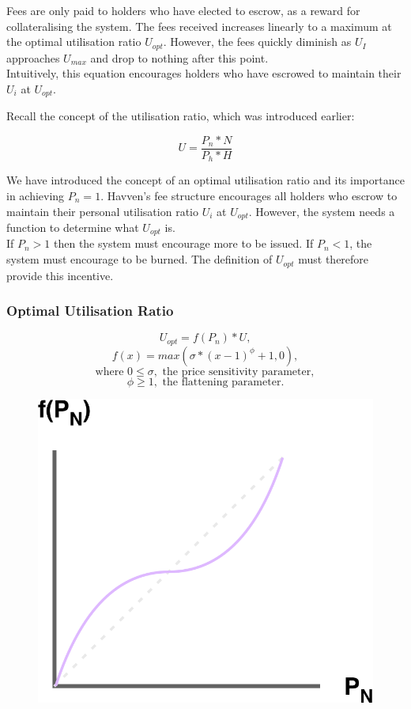 \noindent Fees are only paid to \HAV{} holders who have elected to escrow, as a reward for collateralising the system. The fees received increases linearly to a maximum at the optimal utilisation ratio $U_{opt}$. However, the fees quickly diminish as $U_I$ approaches $U_{max}$ and drop to nothing after this point. \\

\noindent Intuitively, this equation encourages \HAV{} holders who have escrowed to maintain their $U_i$ at $U_{opt}$. 

\newpage

\noindent Recall the concept of the utilisation ratio, which was introduced earlier:

$$ U = \frac{P_n * N}{P_h * H} $$

\noindent We have introduced the concept of an optimal utilisation ratio and its importance in achieving $P_n = 1$. Havven's fee structure encourages all \HAV{} holders who escrow to maintain their personal utilisation ratio $U_i$ at $U_{opt}$. However, the system needs a function to determine what $U_{opt}$ is. \\

\noindent If $P_n > 1$ then the system must encourage more \NOM{} to be issued. If $P_n < 1$, the system must encourage \NOM{} to be burned. The definition of $U_{opt}$ must therefore provide this incentive. \\

\subsubsection{Optimal Utilisation Ratio}

$$ U_{opt} = f(P_n) * U,$$
$$ f(x) = max(\sigma * (x - 1)^{\phi} + 1, 0), $$
$$\text{where } 0 \leq \sigma, \text{ the price sensitivity parameter}, $$
$$\phi \geq 1, \text{ the flattening parameter}. $$

\begin{figure}[h!]
    \centering
    \includegraphics[width=.5\textwidth]{img/U_opt}
\end{figure}

